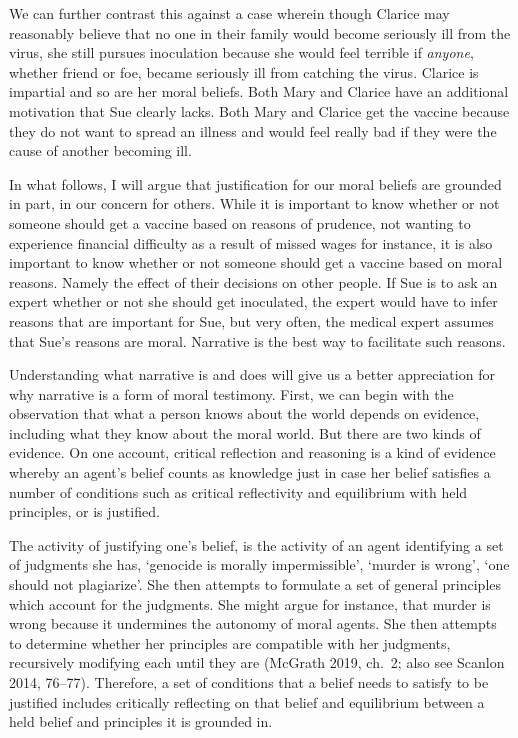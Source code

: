 \documentclass[
  letterpaper,
  DIV=11,
  numbers=noendperiod]{scrartcl}
\theoremstyle{remark}
\begin{document}
We can further contrast this against a case wherein though Clarice may
reasonably believe that no one in their family would become seriously
ill from the virus, she still pursues inoculation because she would feel
terrible if \emph{anyone}, whether friend or foe, became seriously ill
from catching the virus. Clarice is impartial and so are her moral
beliefs. Both Mary and Clarice have an additional motivation that Sue
clearly lacks. Both Mary and Clarice get the vaccine because they do not
want to spread an illness and would feel really bad if they were the
cause of another becoming ill.

In what follows, I will argue that justification for our moral beliefs
are grounded in part, in our concern for others. While it is important
to know whether or not someone should get a vaccine based on reasons of
prudence, not wanting to experience financial difficulty as a result of
missed wages for instance, it is also important to know whether or not
someone should get a vaccine based on moral reasons. Namely the effect
of their decisions on other people. If Sue is to ask an expert whether
or not she should get inoculated, the expert would have to infer reasons
that are important for Sue, but very often, the medical expert assumes
that Sue's reasons are moral. Narrative is the best way to facilitate
such reasons.

Understanding what narrative is and does will give us a better
appreciation for why narrative is a form of moral testimony. First, we
can begin with the observation that what a person knows about the world
depends on evidence, including what they know about the moral world. But
there are two kinds of evidence. On one account, critical reflection and
reasoning is a kind of evidence whereby an agent's belief counts as
knowledge just in case her belief satisfies a number of conditions such
as critical reflectivity and equilibrium with held principles, or is
justified.

The activity of justifying one's belief, is the activity of an agent
identifying a set of judgments she has, `genocide is morally
impermissible', `murder is wrong', `one should not plagiarize'. She then
attempts to formulate a set of general principles which account for the
judgments. She might argue for instance, that murder is wrong because it
undermines the autonomy of moral agents. She then attempts to determine
whether her principles are compatible with her judgments, recursively
modifying each until they are (McGrath 2019, ch.~2; also see Scanlon
2014, 76--77). Therefore, a set of conditions that a belief needs to
satisfy to be justified includes critically reflecting on that belief
and equilibrium between a held belief and principles it is grounded in.
\end{document}
